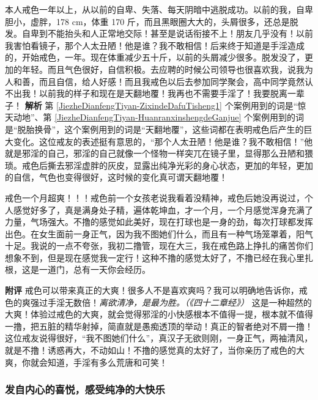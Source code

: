 \begin{case}
    本人戒色一年以上，从以前的自卑、失落、每天阴暗中逃脱成功。以前的我，自卑胆小，虚胖，178 \unit{\cm}，体重 170 斤，而且黑眼圈大大的，头屑很多，还总是脱发。自卑到不能抬头和人正常地交际！甚至是说话衔接不上！朋友几乎没有！以前我害怕看镜子，那个人太丑陋！他是谁？我不敢相信！后来终于知道是手淫造成的，开始戒色，一年。现在体重减少五十斤，以前的头屑减少很多。脱发没了，更加的年轻。而且气色很好，自信积极。去应聘的时候公司领导也很喜欢我，说我为人和善，而且自信，给人好感！而且我戒色以后去参加同学聚会，高中同学竟然认不出我！以前我的样子和现在是天翻地覆！我再也不需要手淫了！我要脱离一辈子！
    \textbf{解析} 第 \ref{JiezheDianfengTiyan-ZixindeDafuTisheng1} 个案例用到的词是“惊天动地”、第 \ref{JiezheDianfengTiyan-HuanranxinshengdeGanjue} 个案例用到的词是“脱胎换骨”，这个案例用到的词是“天翻地覆”，这些词都在表明戒色后产生的巨大变化。这位戒友的表述挺有意思的，“那个人太丑陋！他是谁？我不敢相信！”他就是邪淫的自己，邪淫的自己就像一个怪物一样突兀在镜子里，显得那么丑陋和猥琐。戒色后撕去邪淫虚胖的灰皮，显露出纯净光彩的身心状态，更加的年轻，更加的自信，气色也变得很好，这时候的变化真可谓天翻地覆！
\end{case}

\begin{case}
    戒色一个月超爽！！！戒色前一个女孩老说我看着没精神，戒色后她没再说过，个人感觉好多了，真是满身处子精，遍体乾坤血，才一个月，一个月感觉浑身充满了力量，气场强大。不撸的感觉如此美好，现在打球也是一身的劲，每次打球都发挥出色。在女生面前一身正气，因为我不图她们什么，而且有一种气场笼罩着，阳气十足。我说的一点不夸张，我初二撸管，现在大三，我在戒色路上挣扎的痛苦你们想象不到，但是现在感觉我一定行！这种不撸的感觉太好了，不撸已经在我心里扎根，这是一道门，总有一天你会经历。

    \textbf{附评} 戒色可以带来真正的大爽！很多人不是喜欢爽吗？我可以明确地告诉你，戒色的爽强过手淫无数倍！\textit{离欲清净，是最为胜。（《四十二章经》）} 这是一种超然的大爽！体验过戒色的大爽，就会觉得邪淫的小快感根本不值得一提，根本就不值得一撸，把五脏的精华射掉，简直就是愚痴透顶的举动！真正的智者绝对不屑一撸！这位戒友说得很好，“我不图她们什么”，真汉子无欲则刚，一身正气，两袖清风，就是不撸！诱惑再大，不动如山！不撸的感觉真的太好了，当你亲历了戒色的大爽，你就会知道，手淫有多么荒唐和可笑！
\end{case}

\subsubsection{发自内心的喜悦，感受纯净的大快乐}

